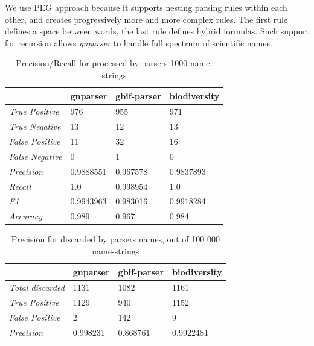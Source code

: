 \documentclass{bmcart}
\begin{document}
We use PEG approach because it supports nesting parsing rules within each other,
and creates progressively more and more complex rules. The first rule defines a
space between words, the last rule defines hybrid formulas.  Such support for
recursion allows \textit{gnparser} to handle full spectrum of scientific names.

\begin{table}[htb]
  \begin{center}
    \caption{Precision/Recall for processed by parsers 1000
    name-strings}\label{table:precision}
    \resizebox{10cm}{!} {
    \begin{tabular}{|l|*{3}{l}|}
      \hline
                             & gnparser & gbif-parser & biodiversity \\
      \hline
      \textit{True Positive} & 976      & 955         & 971          \\
      \textit{True Negative} & 13       & 12          & 13           \\
      \textit{False Positive}& 11       & 32          & 16           \\
      \textit{False Negative}& 0        & 1           & 0            \\
      \textit{Precision}     & 0.9888551& 0.967578    & 0.9837893    \\
      \textit{Recall}        & 1.0      & 0.998954    & 1.0          \\
      \textit{F1}            & 0.9943963& 0.983016    & 0.9918284    \\
      \textit{Accuracy}      & 0.989    & 0.967       & 0.984        \\
      \hline
    \end{tabular}
    }
  \end{center}
\end{table}

\begin{table}[htb]
  \begin{center}
    \caption{Precision for discarded by parsers names, out of 100 000
    name-strings}\label{table:unparsed}
    \resizebox{10cm}{!} {
    \begin{tabular}{| l | *{3}{l} |}
      \hline
                              & gnparser & gbif-parser & biodiversity \\
      \hline
      \textit{Total discarded}& 1131     & 1082        & 1161         \\
      \textit{True Positive}  & 1129     & 940         & 1152         \\
      \textit{False Positive} & 2        & 142         & 9            \\
      \textit{Precision}      & 0.998231 & 0.868761    & 0.9922481    \\
      \hline
    \end{tabular}
  }
  \end{center}
\end{table}
\end{document}
